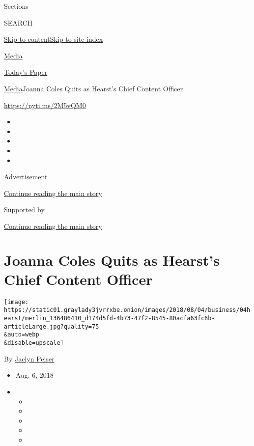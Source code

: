 Sections

SEARCH

\protect\hyperlink{site-content}{Skip to
content}\protect\hyperlink{site-index}{Skip to site index}

\href{https://www.nytimes3xbfgragh.onion/section/business/media}{Media}

\href{https://myaccount.nytimes3xbfgragh.onion/auth/login?response_type=cookie\&client_id=vi}{}

\href{https://www.nytimes3xbfgragh.onion/section/todayspaper}{Today's
Paper}

\href{/section/business/media}{Media}\textbar{}Joanna Coles Quits as
Hearst's Chief Content Officer

\url{https://nyti.ms/2M5vQM0}

\begin{itemize}
\item
\item
\item
\item
\item
\end{itemize}

Advertisement

\protect\hyperlink{after-top}{Continue reading the main story}

Supported by

\protect\hyperlink{after-sponsor}{Continue reading the main story}

\hypertarget{joanna-coles-quits-as-hearsts-chief-content-officer}{%
\section{Joanna Coles Quits as Hearst's Chief Content
Officer}\label{joanna-coles-quits-as-hearsts-chief-content-officer}}

\texttt{[image: https://static01.graylady3jvrrxbe.onion/images/2018/08/04/business/04hearst/merlin\_136486410\_d174d5fd-4b73-47f2-8545-80acfa63fc6b-articleLarge.jpg?quality=75\\\&auto=webp\\\&disable=upscale]}

By \href{https://www.nytimes3xbfgragh.onion/by/jaclyn-peiser}{Jaclyn
Peiser}

\begin{itemize}
\item
  Aug. 6, 2018
\item
  \begin{itemize}
  \item
  \item
  \item
  \item
  \item
  \end{itemize}
\end{itemize}

